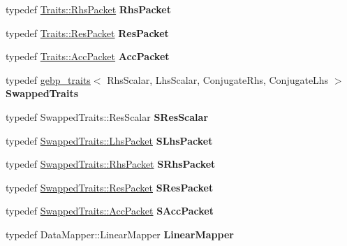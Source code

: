 \begin{DoxyCompactItemize}
typedef \mbox{\hyperlink{struct_eigen_1_1internal_1_1true__type}{Traits\+::\+Rhs\+Packet}} {\bfseries Rhs\+Packet}
\item 
\mbox{\label{struct_eigen_1_1internal_1_1gebp__kernel_accee30d2e60594819d6aec8194ddfa73}} 
typedef \mbox{\hyperlink{struct_eigen_1_1internal_1_1true__type}{Traits\+::\+Res\+Packet}} {\bfseries Res\+Packet}
\item 
\mbox{\label{struct_eigen_1_1internal_1_1gebp__kernel_ad591096b11aea803742dd4482e46961a}} 
typedef \mbox{\hyperlink{struct_eigen_1_1internal_1_1true__type}{Traits\+::\+Acc\+Packet}} {\bfseries Acc\+Packet}
\item 
\mbox{\label{struct_eigen_1_1internal_1_1gebp__kernel_a9793d170707e854eb15e26f27236de8d}} 
typedef \mbox{\hyperlink{class_eigen_1_1internal_1_1gebp__traits}{gebp\+\_\+traits}}$<$ Rhs\+Scalar, Lhs\+Scalar, Conjugate\+Rhs, Conjugate\+Lhs $>$ {\bfseries Swapped\+Traits}
\item 
\mbox{\label{struct_eigen_1_1internal_1_1gebp__kernel_a91134d92cfbc82bccc82836d0589c78a}} 
typedef Swapped\+Traits\+::\+Res\+Scalar {\bfseries S\+Res\+Scalar}
\item 
\mbox{\label{struct_eigen_1_1internal_1_1gebp__kernel_ac6d9a01a6cd5336e08b07c58efee44b6}} 
typedef \mbox{\hyperlink{struct_eigen_1_1internal_1_1true__type}{Swapped\+Traits\+::\+Lhs\+Packet}} {\bfseries S\+Lhs\+Packet}
\item 
\mbox{\label{struct_eigen_1_1internal_1_1gebp__kernel_a6a1a2ff6e30bb70ed43572392dd0530a}} 
typedef \mbox{\hyperlink{struct_eigen_1_1internal_1_1true__type}{Swapped\+Traits\+::\+Rhs\+Packet}} {\bfseries S\+Rhs\+Packet}
\item 
\mbox{\label{struct_eigen_1_1internal_1_1gebp__kernel_a0c4a0b1397b0fe4fc66acd81e87fd614}} 
typedef \mbox{\hyperlink{struct_eigen_1_1internal_1_1true__type}{Swapped\+Traits\+::\+Res\+Packet}} {\bfseries S\+Res\+Packet}
\item 
\mbox{\label{struct_eigen_1_1internal_1_1gebp__kernel_a32e53eb27c3a5b3fe752036a608aab30}} 
typedef \mbox{\hyperlink{struct_eigen_1_1internal_1_1true__type}{Swapped\+Traits\+::\+Acc\+Packet}} {\bfseries S\+Acc\+Packet}
\item 
\mbox{\label{struct_eigen_1_1internal_1_1gebp__kernel_a012d16a8957ad24519397e9f6ed00ab5}} 
typedef Data\+Mapper\+::\+Linear\+Mapper {\bfseries Linear\+Mapper}
\end{DoxyCompactItemize}
